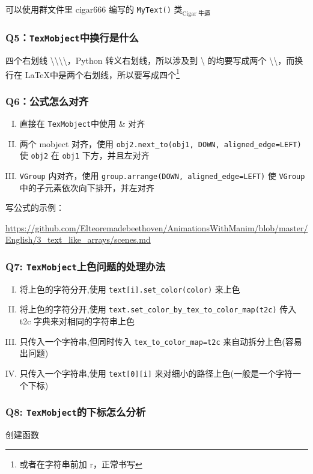 \documentclass[a4paper]{article}
\newcommand{\TexMobject}{\texttt{TexMobject}}
\begin{document}
可以使用群文件里 cigar666 编写的 \texttt{MyText()} 类$_{\text{Cigar 牛逼}}$

\subsubsection*{Q5：\TexMobject 中换行是什么}
四个右划线 \textbackslash \textbackslash \textbackslash \textbackslash，Python 转义右划线，所以涉及到 \textbackslash{} 的均要写成两个 \textbackslash \textbackslash，而换行在 \LaTeX 中是两个右划线，所以要写成四个\footnote{或者在字符串前加 r，正常书写}

\subsubsection*{Q6：公式怎么对齐}
\begin{enumerate}[I.]
    \item 直接在 \TexMobject 中使用 \& 对齐
    \item 两个 mobject 对齐，使用 \texttt{obj2.next\_to(obj1, DOWN, aligned\_edge=LEFT)} 使 \texttt{obj2} 在 \texttt{obj1} 下方，并且左对齐
    \item \texttt{VGroup} 内对齐，使用 \texttt{group.arrange(DOWN, aligned\_edge=LEFT)} 使 \texttt{VGroup} 中的子元素依次向下排开，并左对齐
\end{enumerate}

写公式的示例：

\url{https://github.com/Elteoremadebeethoven/AnimationsWithManim/blob/master/English/3_text_like_arrays/scenes.md}

\subsubsection*{Q7: \TexMobject 上色问题的处理办法}
\begin{enumerate}[I.]
    \item 将上色的字符分开,使用 \texttt{text[i].set\_color(color)} 来上色
    \item 将上色的字符分开,使用 \texttt{text.set\_color\_by\_tex\_to\_color\_map(t2c)} 传入 t2c 字典来对相同的字符串上色
    \item 只传入一个字符串,但同时传入 \texttt{tex\_to\_color\_map=t2c} 来自动拆分上色(容易出问题)
    \item 只传入一个字符串,使用 \texttt{text[0][i]} 来对细小的路径上色(一般是一个字符一个下标)
\end{enumerate}

\subsubsection*{Q8: \TexMobject 的下标怎么分析}
创建函数
\end{document}
